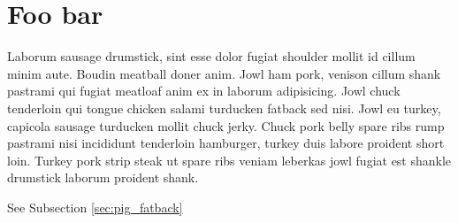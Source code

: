 \chapter{Foo bar}
\label{cha:foo_bar}

Laborum sausage drumstick, sint esse dolor fugiat shoulder mollit id cillum minim aute. Boudin meatball doner anim. Jowl ham pork, venison cillum shank pastrami qui fugiat meatloaf anim ex in laborum adipisicing. Jowl chuck tenderloin qui tongue chicken salami turducken fatback sed nisi. Jowl eu turkey, capicola sausage turducken mollit chuck jerky. Chuck pork belly spare ribs rump pastrami nisi incididunt tenderloin hamburger, turkey duis labore proident short loin. Turkey pork strip steak ut spare ribs veniam leberkas jowl fugiat est shankle drumstick laborum proident shank.

See Subsection \ref{sec:pig_fatback}
